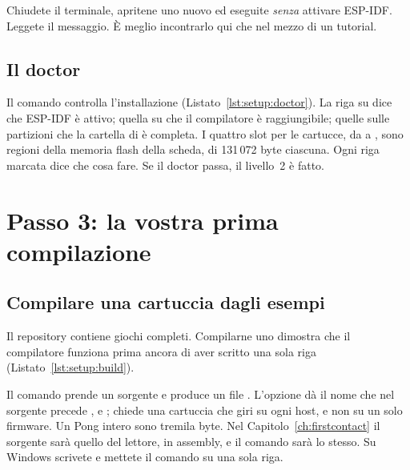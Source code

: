 
\begin{prgtry}
Chiudete il terminale, apritene uno nuovo ed eseguite  \emph{senza} attivare ESP-IDF. Leggete il messaggio. È meglio
incontrarlo qui che nel mezzo di un tutorial.
\end{prgtry}

\subsection{Il doctor}

Il comando  controlla l'installazione
(Listato~\ref{lst:setup:doctor}). La riga su  dice che ESP-IDF è
attivo; quella su  che il compilatore \riscv è
raggiungibile; quelle sulle partizioni che la cartella di \prg è completa. I
quattro slot per le cartucce, da  a , sono regioni
della memoria flash della scheda, di 131\,072 byte ciascuna. Ogni riga marcata
 dice che cosa fare. Se il doctor passa, il livello~2 è fatto.


\section{Passo 3: la vostra prima compilazione}\label{sec:setup:build}

\subsection{Compilare una cartuccia dagli esempi}

Il repository contiene giochi completi. Compilarne uno dimostra che il
compilatore funziona prima ancora di aver scritto una sola riga
(Listato~\ref{lst:setup:build}).


Il comando  prende un sorgente e produce un file
. L'opzione  dà il nome che nel sorgente
precede ,  e ; 
chiede una cartuccia che giri su ogni host, e non su un solo firmware. Un Pong
intero sono tremila byte. Nel Capitolo~\ref{ch:firstcontact} il sorgente sarà
quello del lettore, in assembly, e il comando sarà lo stesso. Su Windows
scrivete  e mettete il comando su una sola riga.

